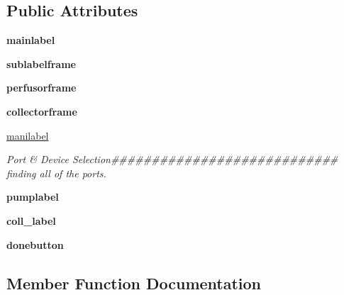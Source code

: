 \subsection*{Public Attributes}
\begin{DoxyCompactItemize}
\item 
\mbox{\label{class_g_u_i_1_1_welcome_page_a9e6eeb6f60a722283ce51970482d60c8}} 
{\bfseries mainlabel}
\item 
\mbox{\label{class_g_u_i_1_1_welcome_page_a82599f77f38933702392daab0cf6a396}} 
{\bfseries sublabelframe}
\item 
\mbox{\label{class_g_u_i_1_1_welcome_page_a9228925baaa2dce27b3c403f6dc989fb}} 
{\bfseries perfusorframe}
\item 
\mbox{\label{class_g_u_i_1_1_welcome_page_acac39ff27c299df0066830308db34032}} 
{\bfseries collectorframe}
\item 
\mbox{\label{class_g_u_i_1_1_welcome_page_abbb18b04d5919182a5ab2808cac1f5fa}} 
\mbox{\hyperlink{class_g_u_i_1_1_welcome_page_abbb18b04d5919182a5ab2808cac1f5fa}{manilabel}}
\begin{DoxyCompactList}\small\item\em Port \& Device Selection\#\#\#\#\#\#\#\#\#\#\#\#\#\#\#\#\#\#\#\#\#\#\#\#\#\#\#\# finding all of the ports. \end{DoxyCompactList}\item 
\mbox{\label{class_g_u_i_1_1_welcome_page_a1760f2af3848183bb73cfec74b78f27c}} 
{\bfseries pumplabel}
\item 
\mbox{\label{class_g_u_i_1_1_welcome_page_a67a73c2b555ee6e4ab9eea5a3048e866}} 
{\bfseries coll\+\_\+label}
\item 
\mbox{\label{class_g_u_i_1_1_welcome_page_a6b31226c328fc95d90de406177cb7db8}} 
{\bfseries donebutton}
\end{DoxyCompactItemize}


\subsection{Member Function Documentation}
\mbox{\label{class_g_u_i_1_1_welcome_page_a7612699922f2f3789aa58e098797b949}} 
